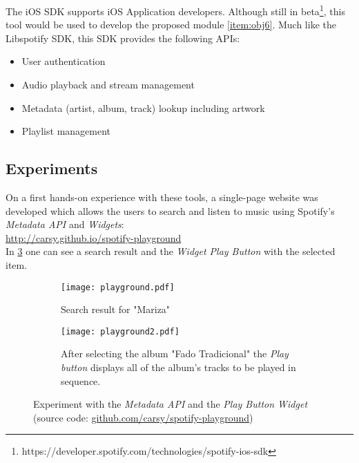     The iOS SDK supports iOS Application developers. Although still in beta\footnote{https://developer.spotify.com/technologies/spotify-ios-sdk}, this tool would be used to develop the proposed module \ref{item:obj6}.
    Much like the Libspotify SDK, this SDK provides the following APIs:

    \begin{itemize}
      \item User authentication
      \item Audio playback and stream management
      \item Metadata (artist, album, track) lookup including artwork
      \item Playlist management
    \end{itemize}



  \subsection{Experiments} %
  \label{sub:experiments}

    On a first hands-on experience with these tools, a single-page website was developed which allows the users to search and listen to music using Spotify's \emph{Metadata API} and \emph{Widgets}: \\

    \url{http://carsy.github.io/spotify-playground} \\

    In \ref{fig:playground} one can see a search result and the \emph{Widget Play Button} with the selected item.

    \begin{figure}
      \centering

      \begin{subfigure}[b]{0.38\textwidth}
        \texttt{[image: playground.pdf]}
        \caption{Search result for "Mariza"}
        \label{fig:playgroun_a}
      \end{subfigure}

      \begin{subfigure}[b]{0.38\textwidth}
        \texttt{[image: playground2.pdf]}
        \caption{After selecting the album "Fado Tradicional" the \emph{Play button} displays all of the album's tracks to be played in sequence.}
        \label{fig:playground_b}
      \end{subfigure}

      \caption{Experiment with the \emph{Metadata API} and the \emph{Play Button Widget} (source code: \url{github.com/carsy/spotify-playground})}
      \label{fig:playground}

    \end{figure}

